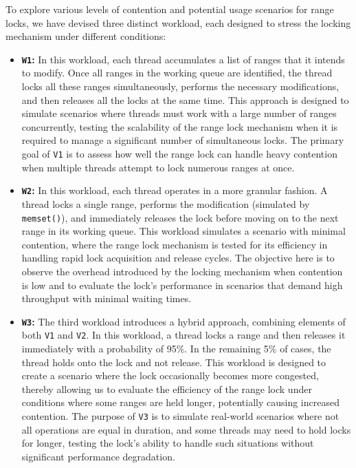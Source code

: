 To explore various levels of contention and potential usage scenarios for range locks, we have devised three distinct workload, each designed to stress the locking mechanism under different conditions:

\begin{itemize} 
    \item \textbf{\texttt{W1}:} In this workload, each thread accumulates a list of ranges that it intends to modify. Once all ranges in the working queue are identified, the thread locks all these ranges simultaneously, performs the necessary modifications, and then releases all the locks at the same time. This approach is designed to simulate scenarios where threads must work with a large number of ranges concurrently, testing the scalability of the range lock mechanism when it is required to manage a significant number of simultaneous locks. The primary goal of \texttt{V1} is to assess how well the range lock can handle heavy contention when multiple threads attempt to lock numerous ranges at once.
    
    \item \textbf{\texttt{W2}:} In this workload, each thread operates in a more granular fashion. A thread locks a single range, performs the modification (simulated by \texttt{memset()}), and immediately releases the lock before moving on to the next range in its working queue. This workload simulates a scenario with minimal contention, where the range lock mechanism is tested for its efficiency in handling rapid lock acquisition and release cycles. The objective here is to observe the overhead introduced by the locking mechanism when contention is low and to evaluate the lock's performance in scenarios that demand high throughput with minimal waiting times.
    
    \item \textbf{\texttt{W3}:} The third workload introduces a hybrid approach, combining elements of both \texttt{V1} and \texttt{V2}. In this workload, a thread locks a range and then releases it immediately with a probability of 95\%. In the remaining 5\% of cases, the thread holds onto the lock and not release. This workload is designed to create a scenario where the lock occasionally becomes more congested, thereby allowing us to evaluate the efficiency of the range lock under conditions where some ranges are held longer, potentially causing increased contention. The purpose of \texttt{V3} is to simulate real-world scenarios where not all operations are equal in duration, and some threads may need to hold locks for longer, testing the lock's ability to handle such situations without significant performance degradation.
\end{itemize}

